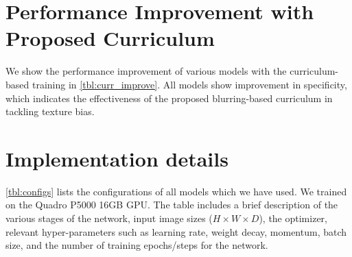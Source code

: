 \documentclass[10pt,twocolumn,letterpaper]{article}
\begin{document}
\begin{table}[t]
	\centering
	\caption{Model performances (10-fold cross-validation) for training with our proposed visual acuity-based curriculum.}
\label{tbl:curr_improve}
\end{table}

\section{Performance Improvement with Proposed Curriculum}
\label{supp:curr_improve}
We show the performance improvement of various models with the curriculum-based training in \cref{tbl:curr_improve}. All models show improvement in specificity, which indicates the effectiveness of the proposed blurring-based curriculum in tackling texture bias. 

\section{Implementation details}
%
\label{supp:impl}
\cref{tbl:configs} lists the configurations of all models which we have used. We trained on the Quadro P5000 16GB GPU. The table includes a brief description of the various stages of the network, input image sizes ($H\times W\times D$), the optimizer, relevant hyper-parameters such as learning rate, weight decay, momentum, batch size, and the number of training epochs/steps for the network. 
\end{document}

